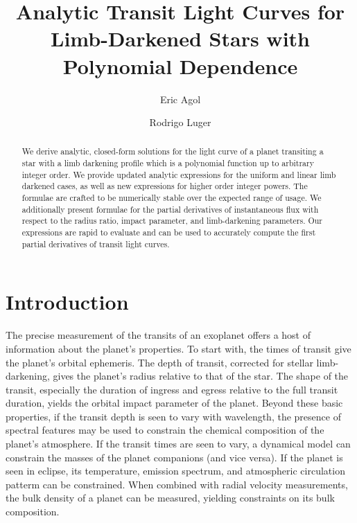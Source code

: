 \documentclass[modern]{aastex61}
\begin{document}

\setlength{\abovedisplayskip}{1.5em}
\setlength{\belowdisplayskip}{1.5em}

\title{%
Analytic Transit Light Curves for Limb-Darkened Stars with Polynomial Dependence
}


\author[0000-0002-0802-9145]{Eric Agol}
\author[0000-0002-0296-3826]{Rodrigo Luger}


\begin{abstract}
 We derive analytic, closed-form solutions for the light curve of a planet 
 transiting a star with a limb darkening profile which is a polynomial function 
 up to arbitrary integer order.  We provide updated analytic expressions for the
 uniform and linear limb darkened cases, as well as new expressions
 for higher order integer powers.  The formulae are crafted to be numerically 
 stable over the expected range of usage.  We additionally present formulae for
 the partial derivatives of instantaneous flux with respect to the radius ratio,
 impact parameter, and limb-darkening parameters.  Our expressions are rapid to 
 evaluate and can be used to accurately compute the first partial derivatives of 
 transit light curves.
\end{abstract}

%
\section{Introduction}
\label{sec:intro}

The precise measurement of the transits of an exoplanet offers a host of information
about the planet's properties.  To start with, the times of transit give
the planet's orbital ephemeris.  The depth of transit, corrected for stellar
limb-darkening, gives the planet's radius relative to that of the star.   The
shape of the transit, especially the duration of ingress and egress relative to
the full transit duration, yields the orbital impact parameter of the planet.  
Beyond these basic properties, if the transit depth is seen to vary with wavelength, 
the presence of spectral features may be used to constrain the chemical composition 
of the planet's atmosphere.  If the transit times are seen to vary, a dynamical 
model can constrain the masses of the planet companions (and vice versa).  If 
the planet is seen in eclipse, its temperature, emission spectrum, and atmospheric 
circulation patterm can be constrained.  When combined with radial velocity 
measurements, the bulk density of a planet can be measured, yielding constraints 
on its bulk composition.
\end{document}
